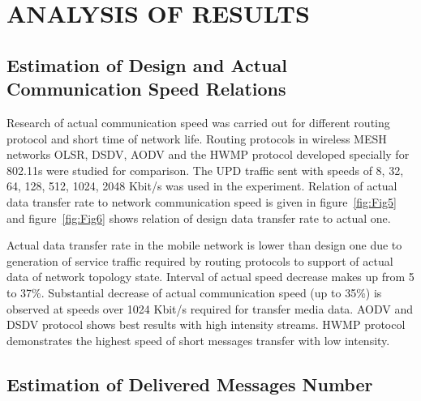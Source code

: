 \documentclass[a4paper,twoside]{article}
\begin{document}
\section{ANALYSIS OF RESULTS}

\subsection{Estimation of Design and Actual Communication Speed Relations}

Research of actual communication speed was carried out for different routing protocol and short time of network life. Routing protocols in wireless MESH networks OLSR, DSDV, AODV and the HWMP protocol developed specially for 802.11s were studied for comparison. The UPD traffic sent with speeds of 8, 32, 64, 128, 512, 1024, 2048 Kbit/s was used in the experiment. Relation of actual data transfer rate to network communication speed is given in figure~\ref{fig:Fig5} and figure~\ref{fig:Fig6} shows relation of design data transfer rate to actual one.

\begin{figure}[!ht]
  \vspace{-0.2cm}
  \vspace{-0.1cm}
\end{figure}

Actual data transfer rate in the mobile network is lower than design one due to generation of service traffic required by routing protocols to support of actual data of network topology state. Interval of actual speed decrease makes up from 5 to 37\%. Substantial decrease of actual communication speed (up to 35\%) is observed at speeds over 1024 Kbit/s required for transfer media data. AODV and DSDV protocol shows best results with high intensity streams. HWMP protocol demonstrates the highest speed of short messages transfer with low intensity.
 
\begin{figure}[!ht]
  \vspace{-0.2cm}
  \vspace{-0.1cm}
\end{figure}

\subsection{Estimation of Delivered Messages Number}
\end{document}
